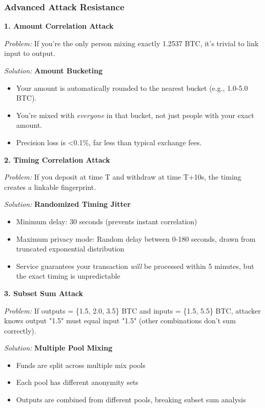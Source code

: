 \documentclass[11pt,a4paper]{article}
\begin{document}
\subsubsection{Advanced Attack Resistance}

\textbf{1. Amount Correlation Attack}

\textit{Problem:} If you're the only person mixing exactly 1.2537 BTC, it's trivial to link input to output.

\textit{Solution:} \textbf{Amount Bucketing}
\begin{itemize}
    \item Your amount is automatically rounded to the nearest bucket (e.g., 1.0-5.0 BTC).
    \item You're mixed with \textit{everyone} in that bucket, not just people with your exact amount.
    \item Precision loss is <0.1\%, far less than typical exchange fees.
\end{itemize}

\textbf{2. Timing Correlation Attack}

\textit{Problem:} If you deposit at time T and withdraw at time T+10s, the timing creates a linkable fingerprint.

\textit{Solution:} \textbf{Randomized Timing Jitter}
\begin{itemize}
    \item Minimum delay: 30 seconds (prevents instant correlation)
    \item Maximum privacy mode: Random delay between 0-180 seconds, drawn from truncated exponential distribution
    \item Service guarantees your transaction \textit{will} be processed within 5 minutes, but the exact timing is unpredictable
\end{itemize}

\textbf{3. Subset Sum Attack}

\textit{Problem:} If outputs = \{1.5, 2.0, 3.5\} BTC and inputs = \{1.5, 5.5\} BTC, attacker knows output "1.5" must equal input "1.5" (other combinations don't sum correctly).

\textit{Solution:} \textbf{Multiple Pool Mixing}
\begin{itemize}
    \item Funds are split across multiple mix pools
    \item Each pool has different anonymity sets
    \item Outputs are combined from different pools, breaking subset sum analysis
\end{itemize}
\end{document}
